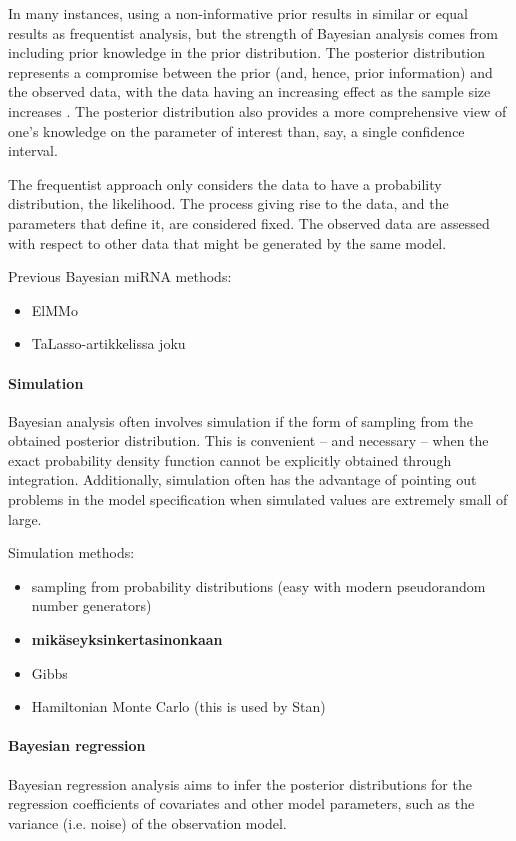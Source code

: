 In many instances, using a non-informative prior results in similar or equal
results as frequentist analysis, but the strength of Bayesian analysis comes
from including prior knowledge in the prior distribution. \citep{Jaynes?} The
posterior distribution represents a compromise between the prior (and, hence,
prior information) and the observed data, with the data having an increasing
effect as the sample size increases \citep{Gelman2013}. The posterior
distribution also provides a more comprehensive view of
one's knowledge on the parameter of interest than, say, a single confidence
interval.

The frequentist approach only considers the data to have a probability
distribution, the likelihood. The process giving rise to the data, and the
parameters that define it, are considered fixed. The observed data are
assessed with respect to other data that might be generated by the same model.






Previous Bayesian miRNA methods:
\begin{itemize}
  \item
  ElMMo
  \item
  TaLasso-artikkelissa joku
\end{itemize}




\paragraph{Simulation}\label{simulation}

Bayesian analysis often involves simulation if the form of sampling from the
obtained posterior distribution. This is convenient -- and necessary -- when
the exact probability density function cannot be explicitly obtained through
integration. Additionally, simulation often has the advantage of pointing out
problems in the model specification when simulated values are extremely small
of large.

Simulation methods:
\begin{itemize}
  \item
  sampling from probability distributions (easy with modern pseudorandom
  number generators)
  \item
  \textbf{mikäseyksinkertasinonkaan}
  \item
  Gibbs
  \item
  Hamiltonian Monte Carlo (this is used by Stan)
\end{itemize}


\paragraph{Bayesian regression}\label{bayesian-regression}

Bayesian regression analysis aims to infer the posterior distributions
for the regression coefficients of covariates and other model parameters,
such as the variance (i.e. noise) of the observation model.
